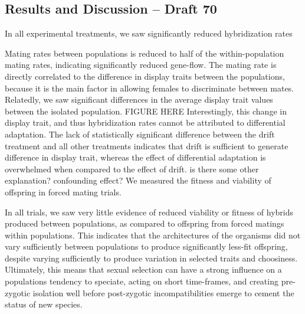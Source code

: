 \subsection{Results and Discussion – Draft 70}

In all experimental treatments, we saw significantly reduced hybridization rates


Mating rates between populations is reduced to half of the within-population mating rates, indicating significantly reduced gene-flow. The mating rate is directly correlated to the difference in display traits between the populations, because it is the main factor in allowing females to discriminate between mates. 
Relatedly, we saw significant differences in the average display trait values between the isolated population.
FIGURE HERE
Interestingly, this change in display trait, and thus hybridization rates cannot be attributed to differential adaptation. 
The lack of statistically significant difference between the drift treatment and all other treatments indicates that drift is sufficient to generate difference in display trait, whereas the effect of differential adaptation is overwhelmed when compared to the effect of drift.
is there some other explanation? confounding effect?
We measured the fitness and viability of offspring in forced mating trials.




In all trials, we saw very little evidence of reduced viability or fitness of hybrids produced between populations, as compared to offspring from forced matings within populations.
This indicates that the architectures of the organisms did not vary sufficiently between populations to produce significantly less-fit offspring, despite varying sufficiently to produce variation in selected traits and choosiness.
Ultimately, this means that sexual selection can have a strong influence on a populations tendency to speciate, acting on short time-frames, and creating pre-zygotic isolation well before post-zygotic incompatibilities emerge to cement the status of new species.